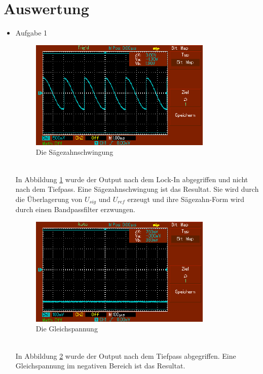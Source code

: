 \documentclass[captions=tableheading]{scrartcl}
\begin{document}
\section{Auswertung}
    \begin{itemize}
        \item{Aufgabe 1 \\}
            \begin{figure}
                \centering
                \includegraphics{Lock_In Bilder/Aufgabe 1/MAP001.pdf}
                \caption{Die Sägezahnschwingung}
                \label{fig:sawsig}
            \end{figure}
            \\
            In Abbildung \ref{fig:sawsig} wurde der Output nach dem Lock-In abgegriffen und nicht nach dem Tiefpass.
            Eine Sägezahnschwingung ist das Resultat. 
            Sie wird durch die Überlagerung von \(U_{sig}\) und \(U_{ref}\) erzeugt und ihre Sägezahn-Form wird durch einen Bandpassfilter erzwungen. 
            \begin{figure}
                \centering
                \includegraphics{Lock_In Bilder/Aufgabe 1/MAP002.pdf}
                \caption{Die Gleichspannung}
                \label{fig:flatsig}
            \end{figure}
            \\
            In Abbildung \ref{fig:flatsig} wurde der Output nach dem Tiefpass abgegriffen.
            Eine Gleichspannung im negativen Bereich ist das Resultat.

\end{itemize}
\end{document}
